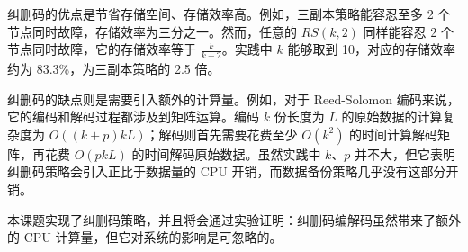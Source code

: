 纠删码的优点是节省存储空间、存储效率高。例如，三副本策略能容忍至多 2 个节点同时故障，存储效率为三分之一。然而，任意的 $RS(k, 2)$ 同样能容忍 2 个节点同时故障，它的存储效率等于 $\frac{k}{k + 2}$。实践中 $k$ 能够取到 10\cite{wang2020}，对应的存储效率约为 83.3\%，为三副本策略的 2.5 倍。

纠删码的缺点则是需要引入额外的计算量。例如，对于 Reed-Solomon 编码来说，它的编码和解码过程都涉及到矩阵运算。编码 $k$ 份长度为 $L$ 的原始数据的计算复杂度为 $O((k+p)kL)$；解码则首先需要花费至少 $O(k^2)$ 的时间计算解码矩阵，再花费 $O(pkL)$ 的时间解码原始数据。虽然实践中 $k$、$p$ 并不大，但它表明纠删码策略会引入正比于数据量的 CPU 开销，而数据备份策略几乎没有这部分开销。

本课题实现了纠删码策略，并且将会通过实验证明：纠删码编解码虽然带来了额外的 CPU 计算量，但它对系统的影响是可忽略的。

